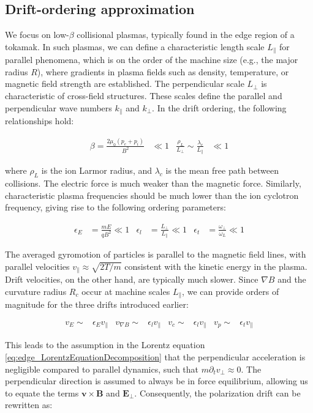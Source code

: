 \subsection{Drift-ordering approximation}
\label{ssec:edge_driftOrdering}

We focus on low-$\beta$ collisional plasmas, typically found in the edge region of a tokamak. In such plasmas, we can define a characteristic length scale $L_\parallel$ for parallel phenomena, which is on the order of the machine size (e.g., the major radius $R$), where gradients in plasma fields such as density, temperature, or magnetic field strength are established. The perpendicular scale $L_\perp$ is characteristic of cross-field structures. These scales define the parallel and perpendicular wave numbers $k_\parallel$ and $k_\perp$. In the drift ordering, the following relationships hold\cite{simakov_2003}:

\begin{align}
	\beta = \frac{2\mu_0(p_e + p_i)}{B^2} &\ll 1 & \frac{\rho_L}{L_\perp} \sim \frac{\lambda_c}{L_\parallel} &\ll 1
\end{align}

where $\rho_L$ is the ion Larmor radius, and $\lambda_c$ is the mean free path between collisions. The electric force is much weaker than the magnetic force. Similarly, characteristic plasma frequencies should be much lower than the ion cyclotron frequency, giving rise to the following ordering parameters:

\begin{align}
	\epsilon_E &= \frac{mE}{qB^2} \ll 1 & \epsilon_l &= \frac{L_\perp}{L_\parallel} \ll 1 & \epsilon_t &= \frac{\omega_\perp}{\omega_L} \ll 1
\end{align}

The averaged gyromotion of particles is parallel to the magnetic field lines, with parallel velocities $v_\parallel \approx \sqrt{2T/m}$ consistent with the kinetic energy in the plasma. Drift velocities, on the other hand, are typically much slower. Since $\nabla B$ and the curvature radius $R_c$ occur at machine scales $L_\parallel$, we can provide orders of magnitude for the three drifts introduced earlier:

\begin{align}
	v_E \sim& \epsilon_E v_\parallel & v_{\nabla B} \sim& \epsilon_l v_\parallel & v_c \sim& \epsilon_l v_\parallel & v_p \sim& \epsilon_t v_\parallel
\end{align}

This leads to the assumption in the Lorentz equation \ref{eq:edge_LorentzEquationDecomposition} that the perpendicular acceleration is negligible compared to parallel dynamics, such that $m\partial_t v_\perp \approx 0$. The perpendicular direction is assumed to always be in force equilibrium, allowing us to equate the terms $\mathbf{v} \times \mathbf{B}$ and $\mathbf{E}_\perp$. Consequently, the polarization drift can be rewritten as:

